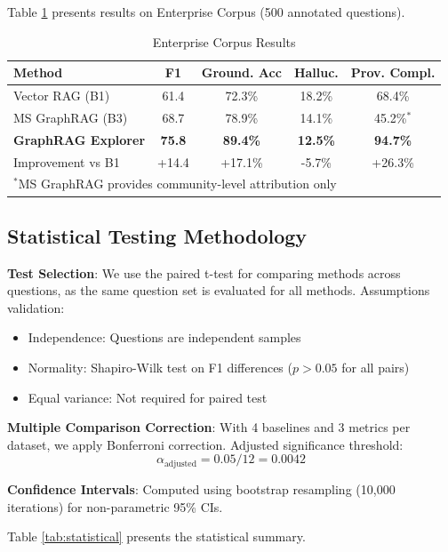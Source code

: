 \documentclass[conference]{IEEEtran}
\begin{document}
Table \ref{tab:enterprise} presents results on Enterprise Corpus (500 annotated questions).

\begin{table}[htbp]
\caption{Enterprise Corpus Results}
\label{tab:enterprise}
\centering
\begin{tabular}{lcccc}
\toprule
\textbf{Method} & \textbf{F1} & \textbf{Ground. Acc} & \textbf{Halluc.} & \textbf{Prov. Compl.} \\
\midrule
Vector RAG (B1) & 61.4 & 72.3\% & 18.2\% & 68.4\% \\
MS GraphRAG (B3) & 68.7 & 78.9\% & 14.1\% & 45.2\%$^*$ \\
\midrule
\textbf{GraphRAG Explorer} & \textbf{75.8} & \textbf{89.4\%} & \textbf{12.5\%} & \textbf{94.7\%} \\
\midrule
Improvement vs B1 & +14.4 & +17.1\% & -5.7\% & +26.3\% \\
\bottomrule
\multicolumn{5}{l}{\footnotesize $^*$MS GraphRAG provides community-level attribution only}
\end{tabular}
\end{table}

\subsection{Statistical Testing Methodology}

\textbf{Test Selection}: We use the paired t-test for comparing methods across questions, as the same question set is evaluated for all methods. Assumptions validation:
\begin{itemize}
    \item Independence: Questions are independent samples
    \item Normality: Shapiro-Wilk test on F1 differences ($p > 0.05$ for all pairs)
    \item Equal variance: Not required for paired test
\end{itemize}

\textbf{Multiple Comparison Correction}: With 4 baselines and 3 metrics per dataset, we apply Bonferroni correction. Adjusted significance threshold:
\begin{equation}
    \alpha_{\text{adjusted}} = 0.05 / 12 = 0.0042
\end{equation}

\textbf{Confidence Intervals}: Computed using bootstrap resampling (10,000 iterations) for non-parametric 95\% CIs.

Table \ref{tab:statistical} presents the statistical summary.
\end{document}
